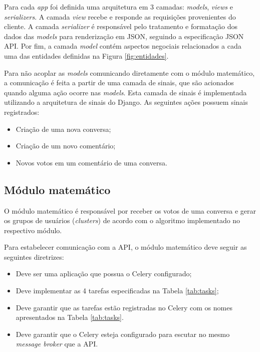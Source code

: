 	Para cada \textit{app} foi definida uma arquitetura
	em 3 camadas: \textit{models}, \textit{views} e \textit{serializers}.
	A camada \textit{view} recebe e responde as requisições provenientes do cliente.
	A camada \textit{serializer} é responsável pelo tratamento e formatação dos dados das \textit{models}
	para renderização em JSON, seguindo a especificação JSON API.
	Por fim, a camada \textit{model} contém aspectos negociais relacionados a cada uma das entidades definidas na 
	Figura \ref{fig:entidades}.
	
	Para não acoplar as \textit{models} comunicando diretamente com o módulo matemático,
	a comunicação é feita a partir de uma camada de sinais, que são acionados quando alguma ação ocorre nas \textit{models}.
	Esta camada de sinais é implementada utilizando a arquitetura de sinais do Django.
	As seguintes ações possuem sinais registrados:
	
	\begin{itemize}
	 \item Criação de uma nova conversa;
	 \item Criação de um novo comentário;
	 \item Novos votos em um comentário de uma conversa.
	\end{itemize}

    
    
    \subsection{Módulo matemático}
	
	O módulo matemático é responsável por receber os votos de uma conversa
	e gerar os grupos de usuários (\textit{clusters}) de acordo com o algoritmo implementado no respectivo módulo.

	Para estabelecer comunicação com a API, o módulo matemático deve seguir as seguintes diretrizes:
	\begin{itemize}
	  \item Deve ser uma aplicação que possua o Celery configurado;
	  \item Deve implementar as 4 tarefas especificadas na Tabela \ref{tab:tasks};
	  \item Deve garantir que as tarefas estão registradas no Celery com os nomes apresentados na Tabela \ref{tab:tasks}.
	  \item Deve garantir que o Celery esteja configurado para escutar no mesmo \textit{message broker} que a API.
	\end{itemize}
	
